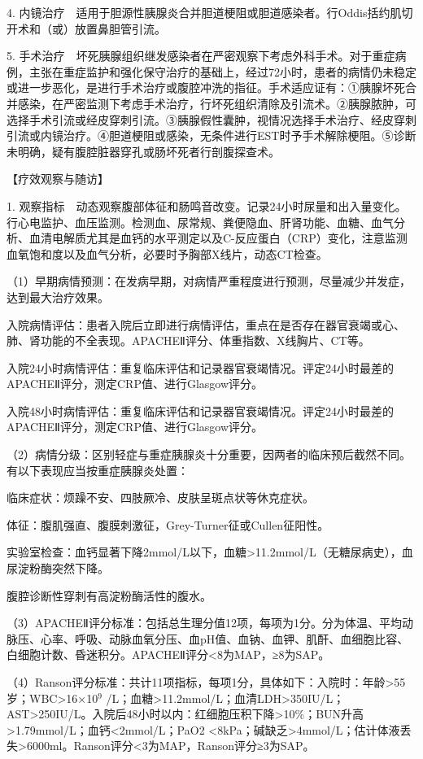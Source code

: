 4.
内镜治疗　适用于胆源性胰腺炎合并胆道梗阻或胆道感染者。行Oddis括约肌切开术和（或）放置鼻胆管引流。

5.
手术治疗　坏死胰腺组织继发感染者在严密观察下考虑外科手术。对于重症病例，主张在重症监护和强化保守治疗的基础上，经过72小时，患者的病情仍未稳定或进一步恶化，是进行手术治疗或腹腔冲洗的指征。手术适应证有：①胰腺坏死合并感染，在严密监测下考虑手术治疗，行坏死组织清除及引流术。②胰腺脓肿，可选择手术引流或经皮穿刺引流。③胰腺假性囊肿，视情况选择手术治疗、经皮穿刺引流或内镜治疗。④胆道梗阻或感染，无条件进行EST时予手术解除梗阻。⑤诊断未明确，疑有腹腔脏器穿孔或肠坏死者行剖腹探查术。

【疗效观察与随访】

1.
观察指标　动态观察腹部体征和肠鸣音改变。记录24小时尿量和出入量变化。行心电监护、血压监测。检测血、尿常规、粪便隐血、肝肾功能、血糖、血气分析、血清电解质尤其是血钙的水平测定以及C-反应蛋白（CRP）变化，注意监测血氧饱和度以及血气分析，必要时予胸部X线片，动态CT检查。

（1）早期病情预测：在发病早期，对病情严重程度进行预测，尽量减少并发症，达到最大治疗效果。

入院病情评估：患者入院后立即进行病情评估，重点在是否存在器官衰竭或心、肺、肾功能的不全表现。APACHEⅡ评分、体重指数、X线胸片、CT等。

入院24小时病情评估：重复临床评估和记录器官衰竭情况。评定24小时最差的APACHEⅡ评分，测定CRP值、进行Glasgow评分。

入院48小时病情评估：重复临床评估和记录器官衰竭情况。评定24小时最差的APACHEⅡ评分，测定CRP值、进行Glasgow评分。

（2）病情分级：区别轻症与重症胰腺炎十分重要，因两者的临床预后截然不同。有以下表现应当按重症胰腺炎处置：

临床症状：烦躁不安、四肢厥冷、皮肤呈斑点状等休克症状。

体征：腹肌强直、腹膜刺激征，Grey-Turner征或Cullen征阳性。

实验室检查：血钙显著下降2mmol/L以下，血糖\textgreater{}11.2mmol/L（无糖尿病史），血尿淀粉酶突然下降。

腹腔诊断性穿刺有高淀粉酶活性的腹水。

（3）APACHEⅡ评分标准：包括总生理分值12项，每项为1分。分为体温、平均动脉压、心率、呼吸、动脉血氧分压、血pH值、血钠、血钾、肌酐、血细胞比容、白细胞计数、昏迷积分。APACHEⅡ评分\textless{}8为MAP，≥8为SAP。

（4）Ranson评分标准：共计11项指标，每项1分，具体如下：入院时：年龄\textgreater{}55岁；WBC\textgreater{}16×10$^{9}$
/L；血糖\textgreater{}11.2mmol/L；血清LDH\textgreater{}350IU/L；AST\textgreater{}250IU/L。入院后48小时以内：红细胞压积下降\textgreater{}10\%；BUN升高\textgreater{}1.79mmol/L；血钙\textless{}2mmol/L；PaO{2}
\textless{}8kPa；碱缺乏\textgreater{}4mmol/L；估计体液丢失\textgreater{}6000ml。Ranson评分\textless{}3为MAP，Ranson评分≥3为SAP。

